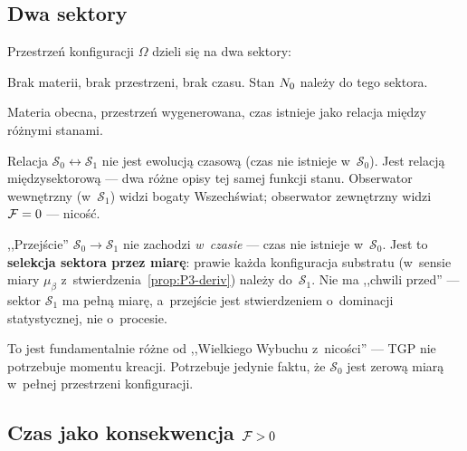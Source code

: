 \subsection{Dwa sektory}\label{ssec:sektory}

\begin{definition}\label{def:sektory}
Przestrze\'n konfiguracji $\Omega$ dzieli si\k{e} na dwa sektory:
\begin{description}[style=nextline,nosep]
  \item[{$\mathcal{S}_0 = \{\sigma : \Ffield[\sigma] = 0\}$
    --- sektor nico\'sci}]
    Brak materii, brak przestrzeni, brak czasu.
    Stan $N_0$ nale\.zy do tego sektora.
  \item[{$\mathcal{S}_1 = \{\sigma : \Ffield[\sigma] > 0\}$
    --- sektor istnienia}]
    Materia obecna, przestrze\'n wygenerowana, czas istnieje
    jako relacja mi\k{e}dzy r\'o\.znymi stanami.
\end{description}
\end{definition}

Relacja $\mathcal{S}_0 \leftrightarrow \mathcal{S}_1$ nie jest
ewolucj\k{a} czasow\k{a} (czas nie istnieje w~$\mathcal{S}_0$).
Jest relacj\k{a} mi\k{e}dzysektorow\k{a} --- dwa r\'o\.zne opisy
tej samej funkcji stanu. Obserwator wewn\k{e}trzny (w~$\mathcal{S}_1$)
widzi bogaty Wszech\'swiat; obserwator zewn\k{e}trzny widzi $\mathcal{F} = 0$
--- nico\'s\'c.

\begin{remark}
,,Przej\'scie'' $\mathcal{S}_0 \to \mathcal{S}_1$ nie zachodzi
\emph{w~czasie} --- czas nie istnieje w~$\mathcal{S}_0$.
Jest to \textbf{selekcja sektora przez miar\k{e}}: prawie
ka\.zda konfiguracja substratu (w~sensie miary $\mu_\beta$
z~stwierdzenia~\ref{prop:P3-deriv}) nale\.zy
do~$\mathcal{S}_1$. Nie ma ,,chwili przed'' ---
sektor $\mathcal{S}_1$ ma pe\l{}n\k{a} miar\k{e}, a~przej\'scie
jest stwierdzeniem o~dominacji statystycznej, nie o~procesie.

To jest fundamentalnie r\'o\.zne od ,,Wielkiego Wybuchu
z~nico\'sci'' --- TGP nie potrzebuje momentu kreacji.
Potrzebuje jedynie faktu, \.ze $\mathcal{S}_0$ jest zerow\k{a}
miar\k{a} w~pe\l{}nej przestrzeni konfiguracji.
\end{remark}

\subsection{Czas jako konsekwencja $\mathcal{F} > 0$}\label{ssec:czas}

